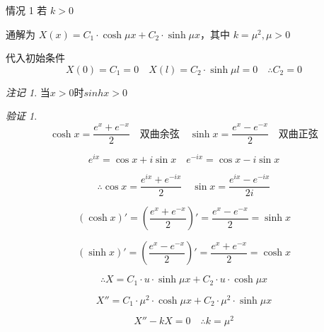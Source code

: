 \documentclass[12pt,a4paper]{article}
\numberwithin{subsection}{section}   %
\numberwithin{subsubsection}{subsection}
\theoremstyle{plain}
\theoremstyle{definition}
\theoremstyle{remark}
\newtheorem{remark}[theorem]{注记}
\theoremstyle{remark}
\newtheorem{verification}[theorem]{验证}
\begin{document}
情况 1 \quad 若 \(k > 0\)

通解为 \(X(x) = C_1 \cdot \cosh \mu x + C_2 \cdot \sinh \mu x\)，其中 \(k = \mu^2,\mu>0\)
	
	代入初始条件 
	\begin{equation}
		X(0) = C_1 = 0 \quad X(l) = C_2 \cdot \sinh \mu l = 0 \quad \therefore C_2 = 0
	\end{equation}
	\begin{remark}
	当$x>0$时$sinhx>0$
	\end{remark}
	
	\begin{verification}	
		\begin{equation*}
			\cosh x = \frac{e^x + e^{-x}}{2} \quad \text{双曲余弦} \quad \sinh x = \frac{e^x - e^{-x}}{2} \quad \text{双曲正弦}
		\end{equation*}
		
		\begin{equation*}
			e^{ix} = \cos x + i \sin x \quad e^{-ix} = \cos x - i \sin x
		\end{equation*}
		
		\begin{equation*}
			\therefore \cos x = \frac{e^{ix} + e^{-ix}}{2} \quad \sin x = \frac{e^{ix} - e^{-ix}}{2i}
		\end{equation*}
		
		\begin{equation*}
			(\cosh x)' = \left( \frac{e^x + e^{-x}}{2} \right)' = \frac{e^x - e^{-x}}{2} = \sinh x
		\end{equation*}
		
		\begin{equation*}
			(\sinh x)' = \left( \frac{e^x - e^{-x}}{2} \right)' = \frac{e^x + e^{-x}}{2} = \cosh x
		\end{equation*}
		
		\begin{equation*}
			\therefore X = C_1 \cdot u \cdot \sinh \mu x + C_2 \cdot u \cdot \cosh \mu x
		\end{equation*}
		
		\begin{equation*}
			X'' = C_1 \cdot \mu^2 \cdot \cosh \mu x + C_2 \cdot \mu^2 \cdot \sinh \mu x
		\end{equation*}
		
		\begin{equation*}
			X'' - kX = 0 \quad \therefore k = \mu^2
		\end{equation*}
		
	\end{verification}	
	
\end{document}
